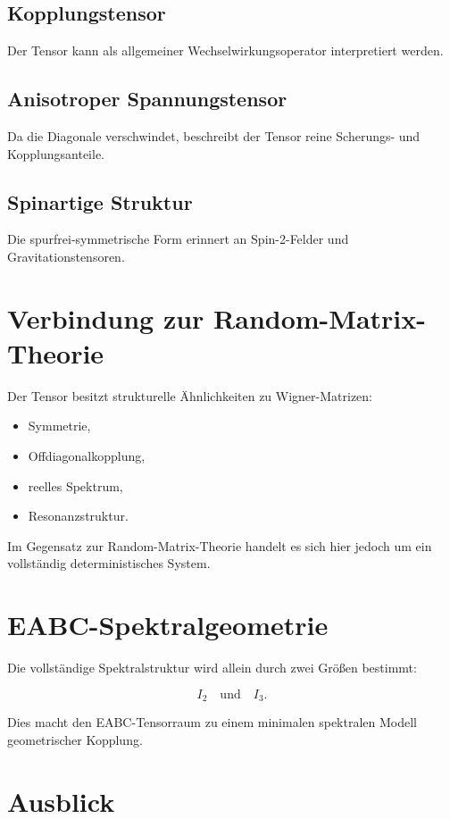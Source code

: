 \documentclass[11pt,a4paper]{article}
\theoremstyle{definition}
\begin{document}
	\subsection{Kopplungstensor}
	
	Der Tensor kann als allgemeiner Wechselwirkungsoperator interpretiert werden.
	
	\subsection{Anisotroper Spannungstensor}
	
	Da die Diagonale verschwindet, beschreibt der Tensor reine Scherungs- und Kopplungsanteile.
	
	\subsection{Spinartige Struktur}
	
	Die spurfrei-symmetrische Form erinnert an Spin-2-Felder und Gravitationstensoren.
	
	\section{Verbindung zur Random-Matrix-Theorie}
	
	Der Tensor besitzt strukturelle Ähnlichkeiten zu Wigner-Matrizen:
	
	\begin{itemize}
		\item Symmetrie,
		\item Offdiagonalkopplung,
		\item reelles Spektrum,
		\item Resonanzstruktur.
	\end{itemize}
	
	Im Gegensatz zur Random-Matrix-Theorie handelt es sich hier jedoch um ein vollständig deterministisches System.
	
	\section{EABC-Spektralgeometrie}
	
	Die vollständige Spektralstruktur wird allein durch zwei Größen bestimmt:
	
	\[
	I_2
	\quad\text{und}\quad
	I_3.
	\]
	
	Dies macht den EABC-Tensorraum zu einem minimalen spektralen Modell geometrischer Kopplung.
	
	\section{Ausblick}
	
\end{document}
